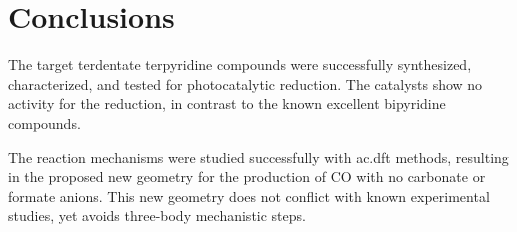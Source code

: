 \chapter{Conclusions}

The target  terdentate terpyridine compounds were successfully synthesized, characterized, and tested for photocatalytic  reduction. The catalysts show no activity for the reduction, in contrast to the known excellent bipyridine compounds. 

The reaction mechanisms were studied successfully with \gls{ac.dft} methods, resulting in the proposed new geometry for the production of {CO} with no carbonate or formate anions. This new geometry does not conflict with known experimental studies, yet avoids three-body mechanistic steps.




